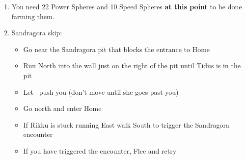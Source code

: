 \begin{enumerate}[resume]
    \blitzballdetermination[true]{%
        \item \formation{\tidus}{\lulu}{\auron}
    }{%
        \item \formation{\tidus}{\rikku}{\auron}
    }
    \item You need 22 Power Spheres and 10 Speed Spheres \textbf{at this point} to be done farming them.
    \item Sandragora skip:
    \begin{itemize}
        \item Go near the Sandragora pit that blocks the entrance to Home
        \item Run North into the wall just on the right of the pit until Tidus is in the pit
        \item Let \rikku\ push you (don't move until she goes past you)
        \item Go north and enter Home
        \item If Rikku is stuck running East walk South to trigger the Sandragora encounter
        \item If you have triggered the encounter, Flee and retry
    \end{itemize}
\end{enumerate}
\ \lossvfill \ \lossnewline \losscb \ 
